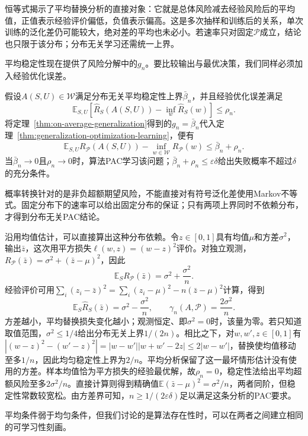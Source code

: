 恒等式揭示了平均替换分析的直接对象：它就是总体风险减去经验风险后的平均值，正值表示经验评价偏低，负值表示偏高。这是多次抽样和训练后的关系，单次训练的泛化差仍可能较大，绝对差的平均也未必小。若速率只对固定$\mathcal P$成立，结论也只限于该分布；分布无关学习还需统一上界。

平均稳定性现在提供了风险分解中的$g_n$。要比较输出与最优决策，我们同样必须加入经验优化误差。

假设$A(S,U)\in\mathcal W$满足分布无关平均稳定性上界$\bar\beta_n$，并且经验优化误差满足
\[
 \mathbb E_{S,U}[\hat R_S(A(S,U))-\inf_w\hat R_S(w)]\leq\rho_n.
\]
将定理~\ref{thm:on-average-generalization}得到的$g_n=\bar\beta_n$代入定理~\ref{thm:generalization-optimization-learning}，便有
\begin{equation}
 \mathbb E_{S,U}R_{\mathcal P}(A(S,U))-
 \inf_{w\in\mathcal W}R_{\mathcal P}(w)\leq\bar\beta_n+\rho_n.
 \label{eq:stability-excess-risk}
\end{equation}
当$\bar\beta_n\to0$且$\rho_n\to0$时，算法PAC学习该问题；$\bar\beta_n+\rho_n\leq\varepsilon\delta$给出失败概率不超过$\delta$的充分条件。

概率转换针对的是非负超额期望风险，不能直接对有符号泛化差使用Markov不等式。固定分布下的速率可以给出固定分布的保证；只有两项上界同时不依赖分布，才得到分布无关PAC结论。

沿用均值估计，可以直接算出这种分布依赖。令$z\in[0,1]$具有均值$\mu$和方差$\sigma^2$，输出$\bar z$，这次用平方损失$\ell(w,z)=(w-z)^2$评价。对独立观测，$R_{\mathcal P}(\bar z)=\sigma^2+(\bar z-\mu)^2$，因此
\[
 \mathbb E_S R_{\mathcal P}(\bar z)=\sigma^2+\frac{\sigma^2}{n}.
\]
经验评价可用$\sum_i(z_i-\bar z)^2=\sum_i(z_i-\mu)^2-n(\bar z-\mu)^2$计算，得到
\[
 \mathbb E_S\hat R_S(\bar z)=\sigma^2-\frac{\sigma^2}{n},
 \qquad \gamma_n(A,\mathcal P)=\frac{2\sigma^2}{n}.
\]
方差越小，平均替换损失变化越小；观测恒定、即$\sigma^2=0$时，该量为零。若只知道取值范围，$\sigma^2\leq1/4$给出分布无关上界$1/(2n)$。相比之下，对$w,w',z\in[0,1]$有$|(w-z)^2-(w'-z)^2|=|w-w'||w+w'-2z|\leq2|w-w'|$，替换使均值移动至多$1/n$，因此均匀稳定性上界为$2/n$。平均分析保留了这一最坏情形估计没有使用的方差。样本均值恰为平方损失的经验最优解，故$\rho_n=0$，稳定性法给出平均超额风险至多$2\sigma^2/n$。直接计算则得到精确值$\mathbb E(\bar z-\mu)^2=\sigma^2/n$，两者同阶，但稳定性常数较宽松。由方差界可知，$n\geq1/(2\varepsilon\delta)$足以满足这条分析的PAC要求。

平均条件弱于均匀条件，但我们讨论的是算法存在性时，可以在两者之间建立相同的可学习性刻画。

